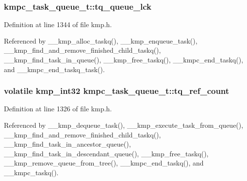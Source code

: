\hypertarget{structkmpc__task__queue__t_a55b6f2614333c7fead5b2e8b60f10078}{
\subsubsection[{tq\-\_\-queue\-\_\-lck}]{ kmpc\-\_\-task\-\_\-queue\-\_\-t\-::tq\-\_\-queue\-\_\-lck}}\label{structkmpc__task__queue__t_a55b6f2614333c7fead5b2e8b60f10078}


Definition at line 1344 of file kmp.\-h.



Referenced by \-\_\-\-\_\-kmp\-\_\-alloc\-\_\-taskq(), \-\_\-\-\_\-kmp\-\_\-enqueue\-\_\-task(), \-\_\-\-\_\-kmp\-\_\-find\-\_\-and\-\_\-remove\-\_\-finished\-\_\-child\-\_\-taskq(), \-\_\-\-\_\-kmp\-\_\-find\-\_\-task\-\_\-in\-\_\-queue(), \-\_\-\-\_\-kmp\-\_\-free\-\_\-taskq(), \-\_\-\-\_\-kmpc\-\_\-end\-\_\-taskq(), and \-\_\-\-\_\-kmpc\-\_\-end\-\_\-taskq\-\_\-task().

\hypertarget{structkmpc__task__queue__t_a4df8f484d6a1c247e69c58c80d22fdb1}{
\subsubsection[{tq\-\_\-ref\-\_\-count}]{\setlength{\rightskip}{0pt plus 5cm}volatile kmp\-\_\-int32 kmpc\-\_\-task\-\_\-queue\-\_\-t\-::tq\-\_\-ref\-\_\-count}}\label{structkmpc__task__queue__t_a4df8f484d6a1c247e69c58c80d22fdb1}


Definition at line 1326 of file kmp.\-h.



Referenced by \-\_\-\-\_\-kmp\-\_\-dequeue\-\_\-task(), \-\_\-\-\_\-kmp\-\_\-execute\-\_\-task\-\_\-from\-\_\-queue(), \-\_\-\-\_\-kmp\-\_\-find\-\_\-and\-\_\-remove\-\_\-finished\-\_\-child\-\_\-taskq(), \-\_\-\-\_\-kmp\-\_\-find\-\_\-task\-\_\-in\-\_\-ancestor\-\_\-queue(), \-\_\-\-\_\-kmp\-\_\-find\-\_\-task\-\_\-in\-\_\-descendant\-\_\-queue(), \-\_\-\-\_\-kmp\-\_\-free\-\_\-taskq(), \-\_\-\-\_\-kmp\-\_\-remove\-\_\-queue\-\_\-from\-\_\-tree(), \-\_\-\-\_\-kmpc\-\_\-end\-\_\-taskq(), and \-\_\-\-\_\-kmpc\-\_\-taskq().


